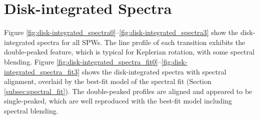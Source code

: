 \documentclass[linenumbers, twocolumn, twocolappendix, astrosymb, times]{aastex631}
\begin{document}





\section{Disk-integrated Spectra}\label{appendix:spectra}
Figure \ref{fig:disk-integrated_spectra0}--\ref{fig:disk-integrated_spectra3} show the disk-integrated spectra for all SPWs. The line profile of each transition exhibits the double-peaked feature, which is typical for Keplerian rotation, with some spectral blending. Figure \ref{fig:disk-integrated_spectra_fit0}--\ref{fig:disk-integrated_spectra_fit3} shows the disk-integrated spectra with spectral alignment, overlaid by the best-fit model of the spectral fit (Section \ref{subsec:spectral_fit}). The double-peaked profiles are aligned and appeared to be single-peaked, which are well reproduced with the best-fit model including spectral blending. 

\begin{figure*}
\caption{Disk-integrated spectra toward V883 Ori without spectral alignment. The emission is integrated over the deprojected disk region with the outer radius of 0 (or 240 au).}
\label{fig:disk-integrated_spectra0}
\end{figure*}

\begin{figure*}
\caption{Continuation of Figure \ref{fig:disk-integrated_spectra0}.}
\label{fig:disk-integrated_spectra1}
\end{figure*}

\begin{figure*}
\caption{Continuation of Figure \ref{fig:disk-integrated_spectra1}.}
\label{fig:disk-integrated_spectra2}
\end{figure*}
\end{document}

